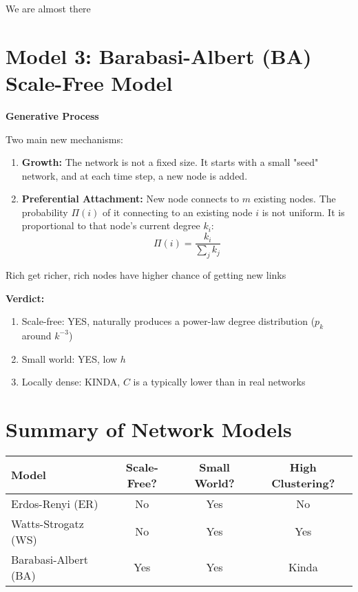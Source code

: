 We are almost there

\section*{Model 3: Barabasi-Albert (BA) Scale-Free Model}

\textbf{Generative Process}

Two main new mechanisms:

\begin{enumerate}
    \item \textbf{Growth:} The network is not a fixed size. It starts with a small "seed" 
    network, and at each time step, a new node is added.
    \item \textbf{Preferential Attachment:} New node connects to $m$ existing nodes. 
    The probability $\Pi(i)$ of it connecting to an existing node $i$ is not uniform. 
    It is proportional to that node's current degree $k_i$:
    \[
    \Pi(i) = \frac{k_i}{\sum_{j}k_j}
    \]
\end{enumerate}

Rich get richer, rich nodes have higher chance of getting new links

\textbf{Verdict:}
\begin{enumerate}
    \item Scale-free: YES, naturally produces a power-law degree distribution ($p_k$ around $k^{-3}$)
    \item Small world: YES, low $h$
    \item Locally dense: KINDA, $C$ is a typically lower than in real networks
\end{enumerate}

\section*{Summary of Network Models}

\begin{table}[h!]
\centering
\renewcommand{\arraystretch}{1.2}
\setlength{\tabcolsep}{8pt}
\begin{tabular}{|l|c|c|c|}
\hline
\textbf{Model} & \textbf{Scale-Free?} & \textbf{Small World?} & \textbf{High Clustering?} \\
\hline
Erdos-Renyi (ER) & No & Yes & No \\
Watts-Strogatz (WS) & No & Yes & Yes \\
Barabasi-Albert (BA) & Yes & Yes & Kinda \\
\hline
\end{tabular}
\end{table}